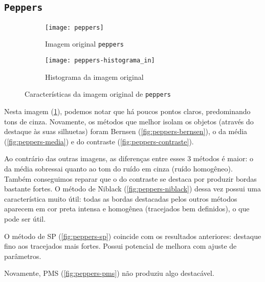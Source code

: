 \documentclass[brazilian,a4paper,twocolumn]{article}
\begin{document}
    \subsection{\texttt{Peppers}}
    \label{sec:peppers}

        \begin{figure}[h]
            \centering
            \begin{subfigure}{0.30\textwidth}
                \texttt{[image: peppers]}
                \caption{Imagem original \texttt{peppers}}
                \label{fig:peppers}
            \end{subfigure}
            \begin{subfigure}{0.5\textwidth}
                \texttt{[image: peppers-histograma\_in]}
                \caption{Histograma da imagem original}
                \label{fig:peppers-histograma}
            \end{subfigure}

            \caption{Características da imagem original de \texttt{peppers}}
        \end{figure}

        Nesta imagem (\cref{fig:peppers}), podemos notar que há poucos pontos claros, predominando tons de cinza. Novamente, os métodos que melhor isolam os objetos (através do destaque às suas silhuetas) foram Bernsen (\cref{fig:peppers-bernsen}), o da média (\cref{fig:peppers-media}) e do contraste (\cref{fig:peppers-contraste}).

        Ao contrário das outras imagens, as diferenças entre esses 3 métodos é maior: o da média sobressai quanto ao tom do ruído em cinza (ruído homogêneo). Também conseguimos reparar que o do contraste se destaca por produzir bordas bastante fortes. O método de Niblack (\cref{fig:peppers-niblack}) dessa vez possui uma característica muito útil: todas as bordas destacadas pelos outros métodos aparecem em cor preta intensa e homogênea (tracejados bem definidos), o que pode ser útil.

        O método de SP (\cref{fig:peppers-sp}) coincide com os resultados anteriores: destaque fino aos tracejados mais fortes. Possui potencial de melhora com ajuste de parâmetros.

        Novamente, PMS (\cref{fig:peppers-pms}) não produziu algo destacável.
\end{document}
